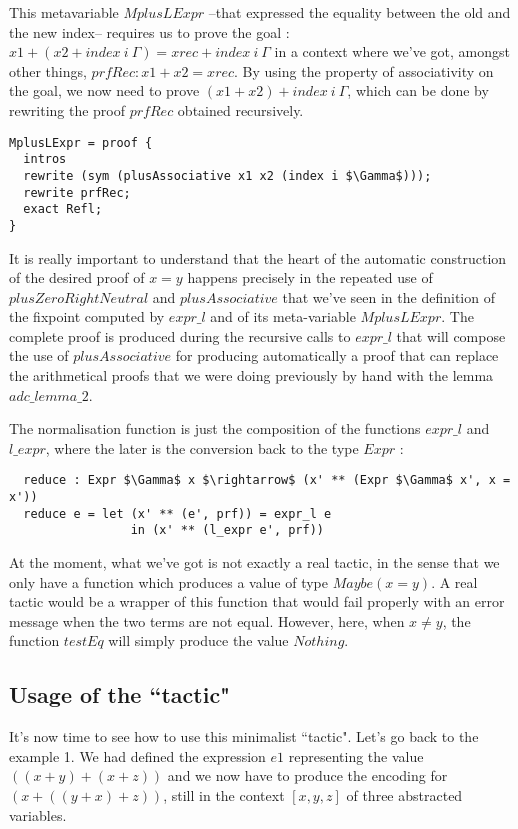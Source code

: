 This metavariable $MplusLExpr$ --that expressed the equality between the old and the new index-- requires us to prove the goal : $x1 + (x2 + index\ i\ \Gamma) = xrec + index\ i\ \Gamma$ in a context where we've got, amongst other things, $prfRec : x1 + x2 = xrec$.
By using the property of associativity on the goal, we now need to prove $(x1 + x2) + index\ i\ \Gamma$, which can be done by rewriting the proof $prfRec$ obtained recursively.


\begin{lstlisting}
MplusLExpr = proof {
  intros
  rewrite (sym (plusAssociative x1 x2 (index i $\Gamma$))); 
  rewrite prfRec; 
  exact Refl;
}
\end{lstlisting}


It is really important to understand that the heart of the automatic construction of the desired proof of $x=y$ happens precisely in the repeated use of $plusZeroRightNeutral$ and $plusAssociative$ that we've seen in the definition of the fixpoint computed by $expr\_l$ and of its meta-variable $MplusLExpr$. The complete proof is produced during the recursive calls to $expr\_l$ that will compose the use of $plusAssociative$ for producing automatically a proof that can replace the arithmetical proofs that we were doing previously by hand with the lemma $adc\_lemma\_2$.

The normalisation function is just the composition of the functions $expr\_l$ and $l\_expr$, where the later is the conversion back to the type $Expr$ :

\begin{lstlisting}
  reduce : Expr $\Gamma$ x $\rightarrow$ (x' ** (Expr $\Gamma$ x', x = x'))
  reduce e = let (x' ** (e', prf)) = expr_l e 
                 in (x' ** (l_expr e', prf))
\end{lstlisting}

At the moment, what we've got is not exactly a real tactic, in the sense that we only have a function which produces a value of type $Maybe (x = y)$. A real tactic would be a wrapper of this function that would fail properly with an error message when the two terms are not equal. However, here, when $x\ne y$, the function $testEq$ will simply produce the value $Nothing$. \\


	\subsection{Usage of the ``tactic"}

It's now time to see how to use this minimalist ``tactic".
Let's go back to the example 1. We had defined the expression $e1$ representing the value $((x + y) + (x + z))$ and we now have to produce the encoding for $(x + ((y + x) + z))$, still in the context $[x, y, z]$ of three abstracted variables.


